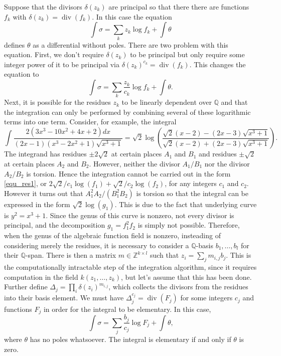 \documentclass[12pt,reqno]{amsart}
\numberwithin{equation}{section}
\begin{document}
Suppose that the divisors $\delta(z_k)$ are principal so that there there are functions $f_k$ with $\delta(z_k) = \operatorname{div}(f_k)$. In this case the equation
\begin{equation}
 \int \sigma = \sum_{k} z_k \log f_k + \int \theta
\end{equation}
defines $\theta$ as a differential without poles. There are two problem with this equation. First, we don't require $\delta(z_k)$ to be principal but only require some integer power of it to be principal via $\delta(z_k)^{c_k} = \operatorname{div}(f_k)$. This changes the equation to 
\begin{equation}
\label{equ_res1}
 \int \sigma = \sum_{k} \frac{z_k}{c_k} \log f_k + \int \theta\text{.}
\end{equation}
Next, it is possible for the residues $z_k$ to be linearly dependent over $\mathbb{Q}$ and that the integration can only be performed by combining several of these logarithmic terms into one term. Consider, for example, the integral
\begin{equation}
\label{equ_residue12}
\int \frac{2(3 x^3-10 x^2+4 x+2)dx}{(2 x-1)(x^3-2x^2+1) \sqrt{x^3+1}}  = \sqrt{2} \log \left(\frac{\sqrt{2}(x-2)-(2 x-3) \sqrt{x^3+1}}{\sqrt{2}(x-2)+(2 x-3) \sqrt{x^3+1}}\right)\text{.}
\end{equation}
The integrand has residues $\pm 2\sqrt{2}$ at certain places $A_1$ and $B_1$ and residues $\pm \sqrt{2}$ at certain places $A_2$ and $B_2$. However, neither the divisor $A_1/B_1$ nor the divisor $A_2/B_2$ is torsion. Hence the integration cannot be carried out in the form \eqref{equ_res1}, or $2\sqrt{2}/c_1 \log (f_1)+ \sqrt{2}/c_2 \log (f_2)$, for any integers $c_1$ and $c_2$. However it turns out that $A_1^2 A_2/(B_1^2 B_2)$ is torsion so that the integral can be expressed in the form $\sqrt{2} \log(g_1)$. This is due to the fact that underlying curve is $y^2=x^3+1$. Since the genus of this curve is nonzero, not every divisor is principal, and the decomposition $g_1 = f_1^2 f_2$ is simply not possible. Therefore, when the genus of the algebraic function field is nonzero, insteading of considering merely the residues, it is necessary to consider a $\mathbb{Q}$-basis $b_1,\dots,b_l$ for their $\mathbb{Q}$-span. There is then a matrix $m \in \mathbb{Z}^{k \times l}$ such that $z_i = \sum_{j} m_{i,j} b_j$. This is the computationally intractable step of the integration algorithm, since it requires computation in the field $k(z_1,\dots,z_k)$, but let's assume that this has been done. Further define $\Delta_j=\prod_{i} \delta(z_i)^{m_{i,j}}$, which collects the divisors from the residues into their basis element. We must have $\Delta_j^{c_j} = \operatorname{div}(F_j)$ for some integers $c_j$ and functions $F_j$ in order for the integral to be elementary. In this case,
\begin{equation*}
 \int \sigma = \sum_{j} \frac{b_j}{c_j} \log F_j + \int \theta\text{,}
\end{equation*}
where $\theta$ has no poles whatsoever. The integral is elementary if and only if $\theta$ is zero.
\end{document}
